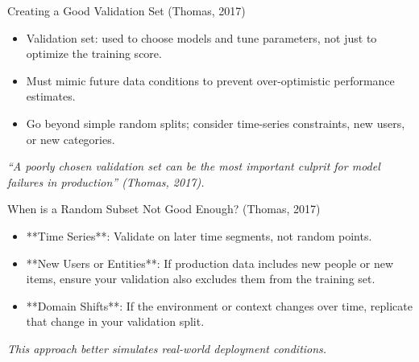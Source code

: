 \documentclass[aspectratio=169]{beamer}
\begin{document}
%
%
\begin{frame}{Creating a Good Validation Set (Thomas, 2017)}
\begin{itemize}
\item Validation set: used to choose models and tune parameters, not just to optimize the training score.
\item Must mimic future data conditions to prevent over-optimistic performance estimates.
\item Go beyond simple random splits; consider time-series constraints, new users, or new categories.
\end{itemize}

\emph{“A poorly chosen validation set can be the most important culprit for model failures in production” (Thomas, 2017).}
\end{frame}

%
%
\begin{frame}{When is a Random Subset Not Good Enough? (Thomas, 2017)}
\begin{itemize}
\item **Time Series**: Validate on later time segments, not random points.
\item **New Users or Entities**: If production data includes new people or new items, ensure your validation also excludes them from the training set.
\item **Domain Shifts**: If the environment or context changes over time, replicate that change in your validation split.
\end{itemize}

\emph{This approach better simulates real-world deployment conditions.}
\end{frame}
\end{document}
